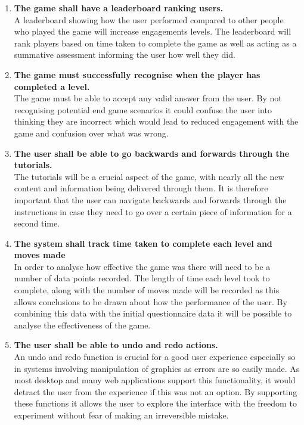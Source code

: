 \documentclass[12pt,a4paper]{report}
\begin{document}
\begin{enumerate}[label*=\arabic*]
	  \item \textbf{The game shall have a leaderboard ranking users.}\\
A leaderboard showing how the user performed compared to other people who played the game will increase engagements levels. The leaderboard will rank players based on time taken to complete the game as well as acting as a summative assessment informing the user how well they did. 



 \item \textbf{The game must successfully recognise when the player has completed a level.}\\
The game must be able to accept any valid answer from the user. By not recognising potential end game scenarios it could confuse the user into thinking they are incorrect which would lead to reduced engagement with the game and confusion over what was wrong.	 	

	  \item \textbf{The user shall be able to go backwards and forwards through the tutorials.}\\
The tutorials will be a crucial aspect of the game, with nearly all the new content and information being delivered through them. It is therefore important that the user can navigate backwards and forwards through the instructions in case they need to go over a certain piece of information for a second time.
            
            	  \item \textbf{The system shall track time taken to complete each level and moves made}\\
In order to analyse how effective the game was there will need to be a number of data points recorded. The length of time each level took to complete, along with the number of moves made will be recorded as this allows conclusions to be drawn about how the performance of the user. By combining this data with the initial questionnaire data it will be possible to analyse the effectiveness of the game.
            
            
            	  \item \textbf{The user shall be able to undo and redo actions.}\\
An undo and redo function is crucial for a good user experience especially so in systems involving manipulation of graphics as errors are so easily made. As most desktop and many web applications support this functionality, it would detract the user from the experience if this was not an option. By supporting these functions it allows the user to explore the interface with the freedom to experiment without fear of making an irreversible mistake. 
            

\end{enumerate}
\end{document}

